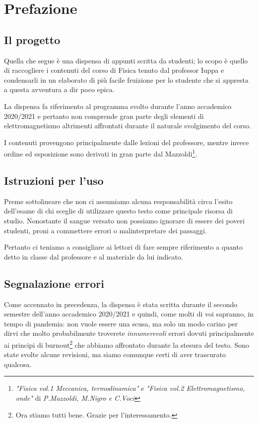 \documentclass[class=book, crop=false, oneside, 12pt]{standalone}
\begin{document}
\chapter*{Prefazione}

\section*{Il progetto}
Quella che segue è una dispensa di appunti scritta da studenti; lo scopo è quello di raccogliere i contenuti del corso di Fisica tenuto dal professor Iuppa e condensarli in un elaborato di più facile fruizione per lo studente che si appresta a questa avventura a dir poco epica.

La dispensa fa riferimento al programma svolto durante l'anno accademico 2020/2021 e pertanto non comprende gran parte degli elementi di elettromagnetismo altrimenti affrontati durante il naturale svolgimento del corso.

I contenuti provengono principalmente dalle lezioni del professore, mentre invece ordine ed esposizione sono derivati in gran parte dal Mazzoldi\footnote{\emph{"Fisica vol.1 Meccanica, termodinamica"} e \emph{"Fisica vol.2 Elettromagnetismo, onde"} di \emph{P.Mazzoldi, M.Nigro e C.Voci}}. 

\section*{Istruzioni per l'uso}
Preme sottolineare che non ci assumiamo alcuna responsabilità circa l'esito dell'esame di chi sceglie di utilizzare questo testo come principale risorsa di studio. Nonostante il sangue versato non possiamo ignorare di essere dei poveri studenti, proni a commettere errori o malinterpretare dei passaggi.

Pertanto ci teniamo a consigliare ai lettori di fare sempre riferimento a quanto detto in classe dal professore e al materiale da lui indicato.

\section*{Segnalazione errori}
Come accennato in precedenza, la dispensa è stata scritta durante il secondo semestre dell'anno accademico 2020/2021 e quindi, come molti di voi sapranno, in tempo di pandemia: non vuole essere una scusa, ma solo un modo carino per dirvi che molto probabilmente troverete \emph{innumerevoli} errori dovuti principalmente ai principi di burnout\footnote{Ora stiamo tutti bene. Grazie per l'interessamento.} che abbiamo affrontato durante la stesura del testo. Sono state svolte alcune revisioni, ma siamo comunque certi di aver trascurato qualcosa.
\end{document}
